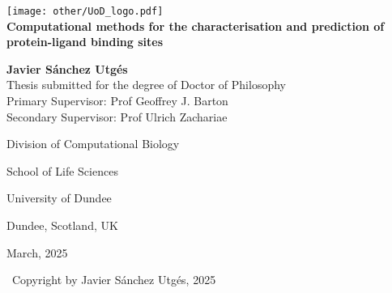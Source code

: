 \begin{titlepage}

	\begin{center}
	
		\texttt{[image: other/UoD\_logo.pdf]}\\[1.5cm]
		
		{\Huge \textbf{Computational methods for the characterisation and prediction of protein-ligand binding sites}}\\[1.5cm]
		
		{\LARGE \textbf{Javier Sánchez Utgés}}\\[1.5cm]
		
		{\Large Thesis submitted for the degree of Doctor of Philosophy}\\[1.5cm]
		
		{\large Primary Supervisor: Prof Geoffrey J. Barton}\\[0.25cm]

		{\large Secondary Supervisor: Prof Ulrich Zachariae}
		
		\vfill
		
		{\normalsize Division of Computational Biology}
		
		{\normalsize School of Life Sciences}
		
		{\normalsize University of Dundee}
		
		{\normalsize Dundee, Scotland, UK}
		
		{\normalsize March, 2025}
		
		\vfill
		
		{\small \textcopyright\ Copyright by Javier Sánchez Utgés, 2025}

	\end{center}
	
\end{titlepage}